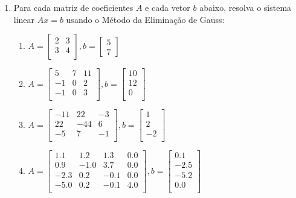 \documentclass[a4paper]{article}
\begin{document}
\begin{enumerate}
\item Para cada matriz de coeficientes $A$ e cada vetor $b$ abaixo,
  resolva o sistema linear $Ax=b$ usando o Método da Eliminação de
  Gauss:
  \begin{enumerate}
  \item 
    $A = \begin{bmatrix}
        2 & 3\\
        3 & 4\\
      \end{bmatrix},
      b= \begin{bmatrix}
        5\\
        7
      \end{bmatrix}$

  \item
    $A = \begin{bmatrix}
      5 & 7 & 11\\
      -1 & 0 & 2\\
      -1 & 0 & 3\\
      \end{bmatrix},
      b= \begin{bmatrix}
        10\\
        12\\
        0\\
      \end{bmatrix}$

  \item
    $A = \begin{bmatrix}
      -11 & 22 & -3\\
      22 & -44 & 6\\
      -5 & 7 & -1\\
      \end{bmatrix},
      b= \begin{bmatrix}
        1\\
        2\\
        -2\\
      \end{bmatrix}$

  \item
    $A = \begin{bmatrix}
      1.1 & 1.2 & 1.3 & 0.0\\
      0.9 & -1.0 & 3.7 & 0.0\\
      -2.3 & 0.2 & -0.1 & 0.0\\
      -5.0 & 0.2 & -0.1 & 4.0\\
      \end{bmatrix},
      b= \begin{bmatrix}
        0.1\\
        -2.5\\
        -5.2\\
        0.0\\
      \end{bmatrix}$


\end{enumerate}
\end{enumerate}
\end{document}
